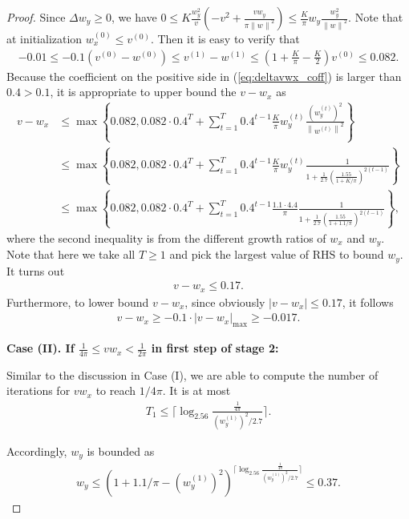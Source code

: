 \documentclass{article}
\theoremstyle{plain}
\theoremstyle{remark}
\newcommand{\norm}[1]{\left\lVert#1\right\rVert}
\newcommand{\T}[1]{^{(#1)}}
\def\t{^{(t)}}
\begin{document}
\begin{proof}
Since $\Delta w_y\ge 0$, we have $0\le K\frac{w_y^2}{v}(-v^2+\frac{v w_y}{\pi\norm{w}^2})\le \frac{K}{\pi} w_y\frac{w_y^2}{\norm{w}^2}$. Note that at initialization $w_x\T{0}\le v\T{0}$. Then it is easy to verify that
\begin{align}
    -0.01\le -0.1 (v\T{0}-w\T{0})\le v\T{1}-w\T{1}\le (1+\frac{K}{\pi}-\frac{K}{2})v\T{0}\le 0.082.
\end{align}
Because the coefficient on the positive side in (\ref{eq:deltavwx_coff}) is larger than $0.4>0.1$, it is appropriate to upper bound the $v-w_x$ as
\begin{align*}
    v-w_x &\le  \max\left\{0.082, 0.082\cdot 0.4^T + \sum_{t=1}^T 0.4^{t-1} \frac{K}{\pi} w_y\t\frac{(w_y\t)^2}{\norm{w\t}^2}\right\} \\
    &\le \max\left\{0.082, 0.082\cdot 0.4^T + \sum_{t=1}^T 0.4^{t-1} \frac{K}{\pi} w_y\t\frac{1}{1+\frac{1}{2.7}\left(\frac{1.55}{1+K/\pi}\right)^{2(t-1)}}\right\} \\
    &\le \max\left\{0.082, 0.082\cdot 0.4^T + \sum_{t=1}^T 0.4^{t-1} \frac{1.1\cdot 4.4}{\pi} \frac{1}{1+\frac{1}{2.7}\left(\frac{1.55}{1+1.1/\pi}\right)^{2(t-1)}}\right\},
\end{align*}
where the second inequality is from the different growth ratios of $w_x$ and $w_y$. Note that here we take all $T\ge1$ and pick the largest value of RHS to bound $w_y$. It turns out
\begin{align}
    v-w_x\le 0.17.
\end{align}
Furthermore, to lower bound $v-w_x$, since obviously $|v-w_x|\le 0.17$, it follows
\begin{align}
    v-w_x\ge -0.1\cdot |v-w_x|_{\max} \ge -0.017.
\end{align}

\textbf{Case (II). If $\frac{1}{4\pi}\le vw_x<\frac{1}{2\pi}$ in first step of stage 2:}

Similar to the discussion in Case (I), we are able to compute the number of iterations for $vw_x$ to reach $1/4\pi$. It is at most
\begin{align}
    T_1\le \lceil\log_{2.56}\frac{\frac{1}{4\pi}}{(w_y\T{1})^2/2.7}\rceil. \label{eq:T1_2}
\end{align}

Accordingly, $w_y$ is bounded as
\begin{align}
    w_y \le \left(1+1.1/\pi-(w_y\T{1})^2\right)^{\lceil\log_{2.56}\frac{\frac{1}{4\pi}}{(w_y\T{1})^2/2.7}\rceil}\le 0.37.
\end{align}


\end{proof}
\end{document}
